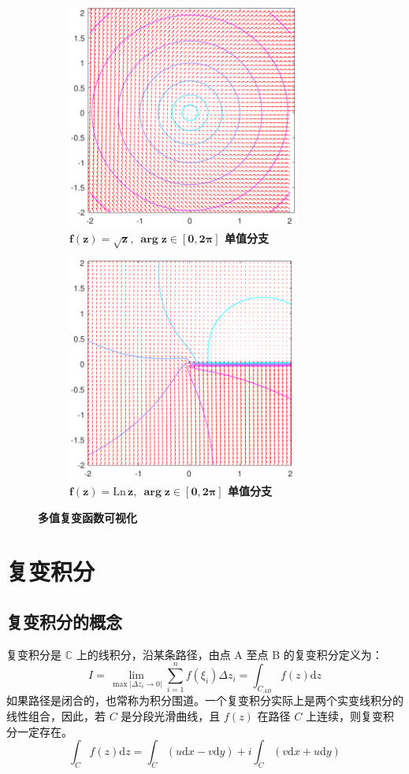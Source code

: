 \documentclass[UTF8]{report}
\def\Ln{\mathrm{Ln\,}}
\def\C{\mathbb{C}}
\theoremstyle{MyLineTheoremStyle} %
\theoremstyle{MyBlockTheoremStyle} %
\theoremstyle{MySubsubsectionStyle} %
\begin{document}
\begin{figure}[H]\centering
    \begin{subfigure}[t]{0.49\textwidth}\centering
        \includegraphics[height=210pt]{assets/1,2/sqrt z.pdf}
        \caption{\bfseries $\boldsymbol{f(z) = \sqrt{z} },\ \boldsymbol{\arg z \in [0, 2\pi]}$ 单值分支 }
    \end{subfigure}\begin{subfigure}[t]{0.49\textwidth}\centering
        \includegraphics[height=210pt]{assets/1,2/ln z.pdf}
        \caption{\bfseries $\boldsymbol{f(z) = \Ln z},\ \boldsymbol{\arg z \in [0, 2\pi]}$ 单值分支  }
    \end{subfigure}
    \caption{\bfseries 多值复变函数可视化 }\label{可视化4}
\end{figure}


\chapter{复变积分}

\section{复变积分的概念}
复变积分是 $\C$ 上的线积分，沿某条路径，由点 A 至点 B 的复变积分定义为：
\begin{equation}
I = \lim_{\max | \Delta z_i \to 0|}\sum_{i=1}^{n} f(\xi_i)\Delta z_i = \int_{C_{AB}} f(z) \mathrm{d}z
\end{equation}
如果路径是闭合的，也常称为积分围道。一个复变积分实际上是两个实变线积分的线性组合，因此，若 $C$ 是分段光滑曲线，且 $f(z)$ 在路径 $C$ 上连续，则复变积分一定存在。
\begin{equation}
\int_{C}f(z) \mathrm{d}z = \int_{C}(u \mathrm{d}x - v \mathrm{d}y) + i \int_{C}( v \mathrm{d}x + u \mathrm{d}y)
\end{equation}
\end{document}
